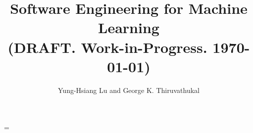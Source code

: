 

\begin{comment}

to find all files that contain a term (useful for creating index)

grep -r term * | grep tex | sed 's/:/ /g' | awk '{print $1}' | sort | uniq

\end{comment}

\newcommand{\progpath}{\basepath/programs}

\makeatletter
\def\seealso#1#2{{\em see also\/} #1, #2}
\makeatother

\title{Software Engineering for Machine Learning \\
{\Large (DRAFT. Work-in-Progress.  \today)}}
\author{Yung-Hsiang Lu and
George K. Thiruvathukal}

%
%

\emergencystretch=\maxdimen
{}



\begin{comment}
reduce space

titlesec
http://www.ctex.org/documents/packages/layout/titlesec.pdf
wrapfig

\end{comment}

\maketitle

   
     

   

\tableofcontents
\listoffigures
\listoftables



% 


\mainmatter

\begin{comment}
Part1: Software Tools and Development Process
   Chapter 0: Python Basics
   Chapter 1: Version Control, Pull Requests
   Chapter 2: Continuous Integration, Unit Tests
   Chapter 3: Branch and Web Services
   Chapter 4: Documentation
   Chapter 5: Graphics Packages
\end{comment}

